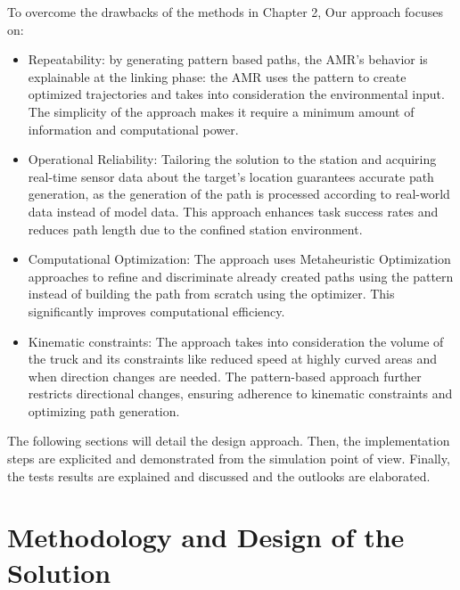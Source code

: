 To overcome the drawbacks of the methods in Chapter 2, Our approach focuses on:
\begin{itemize}
    \item Repeatability: by generating pattern based paths, the AMR's behavior is explainable at 
    the linking phase: the AMR uses the pattern to create optimized trajectories and takes into 
    consideration the environmental input. The simplicity of the approach makes it require a minimum 
    amount of information and computational power. 
    \item Operational Reliability: Tailoring the solution to the station and acquiring real-time sensor data about
    the target's location guarantees accurate path generation, as the generation of the path is processed 
    according to real-world data instead of model data. 
    This approach enhances task success rates and reduces path length due to the confined station environment.

    \item Computational Optimization: The approach uses Metaheuristic Optimization approaches
    to refine and discriminate already created paths using the pattern instead of building the path 
    from scratch using 
    the optimizer. This significantly improves computational efficiency. 

    \item Kinematic constraints: The approach takes into consideration the volume of the truck and its 
    constraints like reduced speed at highly curved areas and when direction changes are needed. 
    The pattern-based approach further restricts directional changes, ensuring adherence to kinematic 
    constraints and optimizing path generation.
\end{itemize}

The following sections will detail the design  approach. Then, the implementation steps are 
explicited and demonstrated from the simulation point of view. Finally, the tests results are explained 
and discussed and the outlooks are elaborated. 

\section{Methodology and Design of the Solution}

